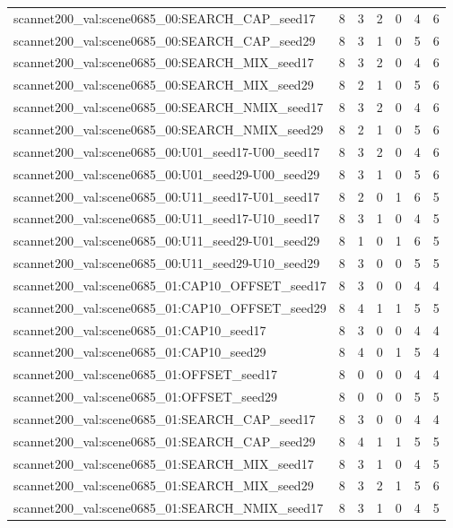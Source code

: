 \begin{table}[t]
\begin{tabular}{lrrrrrr}
scannet200\_val:scene0685\_00:SEARCH\_CAP\_seed17 & 8 & 3 & 2 & 0 & 4 & 6 \\
scannet200\_val:scene0685\_00:SEARCH\_CAP\_seed29 & 8 & 3 & 1 & 0 & 5 & 6 \\
scannet200\_val:scene0685\_00:SEARCH\_MIX\_seed17 & 8 & 3 & 2 & 0 & 4 & 6 \\
scannet200\_val:scene0685\_00:SEARCH\_MIX\_seed29 & 8 & 2 & 1 & 0 & 5 & 6 \\
scannet200\_val:scene0685\_00:SEARCH\_NMIX\_seed17 & 8 & 3 & 2 & 0 & 4 & 6 \\
scannet200\_val:scene0685\_00:SEARCH\_NMIX\_seed29 & 8 & 2 & 1 & 0 & 5 & 6 \\
scannet200\_val:scene0685\_00:U01\_seed17-U00\_seed17 & 8 & 3 & 2 & 0 & 4 & 6 \\
scannet200\_val:scene0685\_00:U01\_seed29-U00\_seed29 & 8 & 3 & 1 & 0 & 5 & 6 \\
scannet200\_val:scene0685\_00:U11\_seed17-U01\_seed17 & 8 & 2 & 0 & 1 & 6 & 5 \\
scannet200\_val:scene0685\_00:U11\_seed17-U10\_seed17 & 8 & 3 & 1 & 0 & 4 & 5 \\
scannet200\_val:scene0685\_00:U11\_seed29-U01\_seed29 & 8 & 1 & 0 & 1 & 6 & 5 \\
scannet200\_val:scene0685\_00:U11\_seed29-U10\_seed29 & 8 & 3 & 0 & 0 & 5 & 5 \\
scannet200\_val:scene0685\_01:CAP10\_OFFSET\_seed17 & 8 & 3 & 0 & 0 & 4 & 4 \\
scannet200\_val:scene0685\_01:CAP10\_OFFSET\_seed29 & 8 & 4 & 1 & 1 & 5 & 5 \\
scannet200\_val:scene0685\_01:CAP10\_seed17 & 8 & 3 & 0 & 0 & 4 & 4 \\
scannet200\_val:scene0685\_01:CAP10\_seed29 & 8 & 4 & 0 & 1 & 5 & 4 \\
scannet200\_val:scene0685\_01:OFFSET\_seed17 & 8 & 0 & 0 & 0 & 4 & 4 \\
scannet200\_val:scene0685\_01:OFFSET\_seed29 & 8 & 0 & 0 & 0 & 5 & 5 \\
scannet200\_val:scene0685\_01:SEARCH\_CAP\_seed17 & 8 & 3 & 0 & 0 & 4 & 4 \\
scannet200\_val:scene0685\_01:SEARCH\_CAP\_seed29 & 8 & 4 & 1 & 1 & 5 & 5 \\
scannet200\_val:scene0685\_01:SEARCH\_MIX\_seed17 & 8 & 3 & 1 & 0 & 4 & 5 \\
scannet200\_val:scene0685\_01:SEARCH\_MIX\_seed29 & 8 & 3 & 2 & 1 & 5 & 6 \\
scannet200\_val:scene0685\_01:SEARCH\_NMIX\_seed17 & 8 & 3 & 1 & 0 & 4 & 5 \\

\end{tabular}
\end{table}

